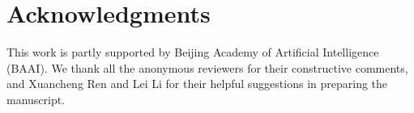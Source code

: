 \documentclass[11pt,a4paper]{article}
\begin{document}
\section*{Acknowledgments}
This work is partly supported by Beijing Academy  of Artificial Intelligence (BAAI). 
We thank all the anonymous reviewers for their constructive comments, and Xuancheng Ren and Lei Li for their helpful suggestions in preparing the manuscript. 



\end{document}
